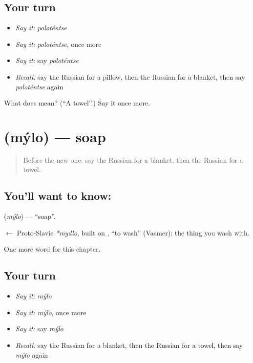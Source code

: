 \subsection*{Your turn}
\begin{itemize}
\raggedright
  \item \emph{Say it:} \emph{poloténtse}
  \item \emph{Say it:} \emph{poloténtse}, once more
  \item \emph{Say it:} say \emph{poloténtse}
  \item \emph{Recall:} say the Russian for a pillow, then the Russian for a blanket, then say \emph{poloténtse} again
\end{itemize}

\begin{tcolorbox}[breakable,colback=teal!4,colframe=teal!35!black,title={Before you move on}]
What does  mean? (\textquotedblleft{}A towel\textquotedblright{}.) Say it once more.
\end{tcolorbox}
\section[\texorpdfstring{\ru{мыло} (mýlo)}{мыло (mýlo)}]{ (mýlo) — soap}

\label{lesson:RU-C96-soap}



\begin{quote}
Before the new one: say the Russian for a blanket, then the Russian for a towel.
\end{quote}

\subsection*{You'll want to know: }
\textbf{} (\emph{mýlo}) — \textquotedblleft{}soap\textquotedblright{}.

\begin{cousinweb}
\textbf{} $\leftarrow$ Proto-Slavic \emph{*mydlo}, built on \emph{}, \textquotedblleft{}to wash\textquotedblright{} (Vasmer): the thing you wash with.
\end{cousinweb}

\begin{grammarlens}[title={What you've built}]
One more word for this chapter.
\end{grammarlens}

\subsection*{Your turn}
\begin{itemize}
\raggedright
  \item \emph{Say it:} \emph{mýlo}
  \item \emph{Say it:} \emph{mýlo}, once more
  \item \emph{Say it:} say \emph{mýlo}
  \item \emph{Recall:} say the Russian for a blanket, then the Russian for a towel, then say \emph{mýlo} again
\end{itemize}

